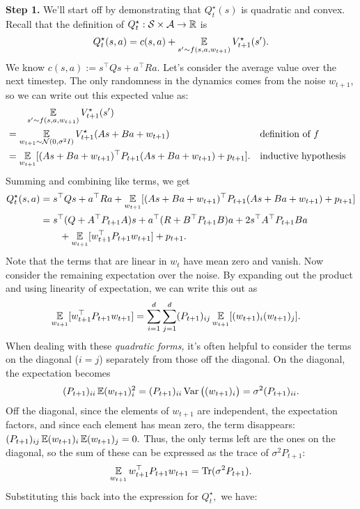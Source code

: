 \documentclass[../main/main]{subfiles}
\begin{document}
\textbf{Step 1.} We'll start off by demonstrating that $Q^\star_t(s)$ is quadratic and convex.
Recall that the definition of $Q^\star_t : \mathcal{S} \times \mathcal{A} \to \mathbb{R}$ is \[
    Q^\star_t(s, a) = c(s, a) + \operatorname*{\mathbb{E}}_{s' \sim f(s, a, w_{t+1})} V^\star_{t+1}(s').
\]
We know $c(s, a) := s^\top Q s + a^\top R a.$ Let's consider the average value
over the next timestep. The only randomness in the dynamics comes from the noise
$w_{t+1}$, so we can write out this expected value as:
\begin{align*}
    &\qquad \operatorname*{\mathbb{E}}_{s' \sim f(s, a, w_{t+1})} V^\star_{t+1}(s') \\
    &= \operatorname*{\mathbb{E}}_{w_{t+1} \sim \mathcal{N}(0, \sigma^2 I)} V^\star_{t+1}(As + Ba + w_{t+1}) && \text{definition of } f \\
    &= \operatorname*{\mathbb{E}}_{w_{t+1}} [ (As + Ba + w_{t+1})^\top P_{t+1} (As + Ba + w_{t+1}) + p_{t+1} ]. && \text{inductive hypothesis}
\end{align*}
Summing and combining like terms, we get \begin{align*}
    Q^\star_t(s, a) &= s^\top Q s + a^\top R a + \operatorname*{\mathbb{E}}_{w_{t+1}} [(As + Ba + w_{t+1})^\top P_{t+1} (As + Ba + w_{t+1}) + p_{t+1}] \\
    &= s^\top (Q + A^\top P_{t+1} A)s + a^\top (R + B^\top P_{t+1} B) a + 2 s^\top A^\top P_{t+1} B a \\
    &\qquad + \operatorname*{\mathbb{E}}_{w_{t+1}} [w_{t+1}^\top P_{t+1} w_{t+1}] + p_{t+1}.
\end{align*}
Note that the terms that are linear in $w_t$ have mean zero and vanish.
Now consider the remaining expectation over the noise. By expanding out the product and using linearity of
expectation, we can write this out as \begin{align*}
    \operatorname*{\mathbb{E}}_{w_{t+1}} [w_{t+1}^\top P_{t+1} w_{t+1}] &= \sum_{i=1}^d \sum_{j=1}^d (P_{t+1})_{ij} \operatorname*{\mathbb{E}}_{w_{t+1}} [(w_{t+1})_i (w_{t+1})_j].
\end{align*}
When dealing with these \emph{quadratic forms,} it's often helpful to consider the terms
on the diagonal ($i = j$) separately from those off the diagonal. On the diagonal, the
expectation becomes \[ (P_{t+1})_{ii} \operatorname*{\mathbb{E}} (w_{t+1})_i^2 = (P_{t+1})_{ii} \operatorname*{\textrm{Var}} \big((w_{t+1})_i \big) = \sigma^2 (P_{t+1})_{ii}. \]
Off the diagonal, since the elements of $w_{t+1}$ are independent,
the expectation factors, and since each element has mean zero, the term disappears: $(P_{t+1})_{ij} \operatorname*{\mathbb{E}} (w_{t+1})_i \operatorname*{\mathbb{E}} (w_{t+1})_j = 0.$
Thus, the only terms left are the ones on the diagonal, so the sum of these can
be expressed as the trace of $\sigma^2 P_{t+1}$: \[
    \operatorname*{\mathbb{E}}_{w_{t+1}} w_{t+1}^\top P_{t+1} w_{t+1} = \operatorname*{\textrm{Tr}}(\sigma^2 P_{t+1}).
\]
Substituting this back into the expression for $Q^\star_t,$ we have:
\end{document}
